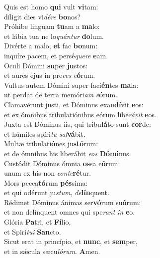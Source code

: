 \evenverse Quis est homo \textbf{qui} vult \textbf{vi}tam:~\*\\
\evenverse díligit dies vi\textit{dé}\textit{re} \textbf{bo}nos?\\
\oddverse Próhibe linguam \textbf{tu}am a \textbf{ma}lo:~\*\\
\oddverse et lábia tua ne lo\textit{quán}\textit{tur} \textbf{do}lum.\\
\evenverse Divérte a malo, \textbf{et} fac \textbf{bo}num:~\*\\
\evenverse inquíre pacem, et persé\textit{que}\textit{re} \textbf{e}am.\\
\oddverse Oculi Dómini \textbf{su}per \textbf{ju}stos:~\*\\
\oddverse et aures ejus in pre\textit{ces} \textit{e}\textbf{ó}rum.\\
\evenverse Vultus autem Dómini super faci\textbf{én}tes \textbf{ma}la:~\*\\
\evenverse ut perdat de terra memóri\textit{am} \textit{e}\textbf{ó}rum.\\
\oddverse Clamavérunt justi, et Dóminus exau\textbf{dí}vit \textbf{e}os:~\*\\
\oddverse et ex ómnibus tribulatiónibus eórum libe\textit{rá}\textit{vit} \textbf{e}os.\\
\evenverse Juxta est Dóminus iis, qui tribu\textbf{lá}to sunt \textbf{cor}de:~\*\\
\evenverse et húmiles spíri\textit{tu} \textit{sal}\textbf{vá}bit.\\
\oddverse Multæ tribulati\textbf{ó}nes ju\textbf{stó}rum:~\*\\
\oddverse et de ómnibus his liberábit \textit{e}\textit{os} \textbf{Dó}\textbf{mi}nus.\\
\evenverse Custódit Dóminus ómnia \textbf{os}sa e\textbf{ó}rum:~\*\\
\evenverse unum ex his non \textit{con}\textit{te}\textbf{ré}tur.\\
\oddverse Mors pecca\textbf{tó}rum \textbf{pés}sima:~\*\\
\oddverse et qui odérunt ju\textit{stum}, \textit{de}\textbf{lín}quent.\\
\evenverse Rédimet Dóminus ánimas ser\textbf{vó}rum su\textbf{ó}rum:~\*\\
\evenverse et non delínquent omnes qui spe\textit{rant} \textit{in} \textbf{e}o.\\
\oddverse Glória \textbf{Pa}tri, et \textbf{Fí}lio,~\*\\
\oddverse et Spirí\textit{tu}\textit{i} \textbf{San}cto.\\
\evenverse Sicut erat in princípio, et \textbf{nunc}, et \textbf{sem}per,~\*\\
\evenverse et in sǽcula sæcu\textit{ló}\textit{rum}. \textbf{A}men.\\
